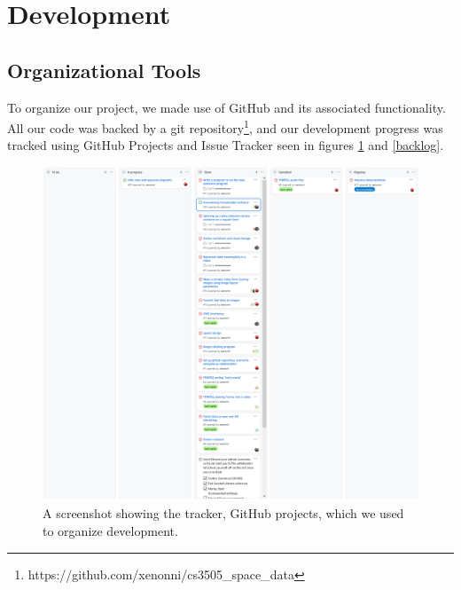 \documentclass{article}
\begin{document}
\section{Development}
  \subsection{Organizational Tools}
  To organize our project, we made use of GitHub and its associated functionality. All our code was backed by a git repository\footnote{https://github.com/xenonni/cs3505\_space\_data}, and our development progress was tracked using GitHub Projects and Issue Tracker seen in figures \ref{github_projects} and \ref{backlog}.
  \begin{figure}[h!]
    \centering
    \includegraphics[width=\linewidth]{img/github_projects.png}
    \caption{A screenshot showing the tracker, GitHub projects, which we used to organize development.}
    \label{github_projects}
  \end{figure}
\end{document}
